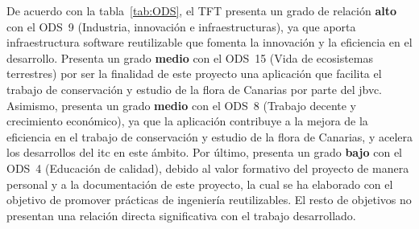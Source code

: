 De acuerdo con la tabla~\ref{tab:ODS}, el TFT presenta un grado de relación
\textbf{alto} con el ODS~9 (Industria, innovación e infraestructuras), ya que
aporta infraestructura software reutilizable que fomenta la innovación y la
eficiencia en el desarrollo. Presenta un grado \textbf{medio} con el ODS~15 (Vida de ecosistemas terrestres) por
ser la finalidad de este proyecto una aplicación que facilita el trabajo de conservación y estudio 
de la flora de Canarias por parte del \gls{jbvc}. Asimismo, presenta un grado \textbf{medio} con el ODS~8 
(Trabajo decente y crecimiento económico), ya que la aplicación contribuye a la mejora de la eficiencia 
en el trabajo de conservación y estudio de la flora de Canarias, y acelera los desarrollos del \gls{itc} 
en este ámbito. Por último, presenta un grado \textbf{bajo} con el ODS~4 (Educación de calidad),
debido al valor formativo del proyecto de manera personal y a la documentación de este
proyecto, la cual se ha elaborado con el objetivo de promover prácticas de
ingeniería reutilizables. El resto de objetivos no presentan una relación directa
significativa con el trabajo desarrollado.
